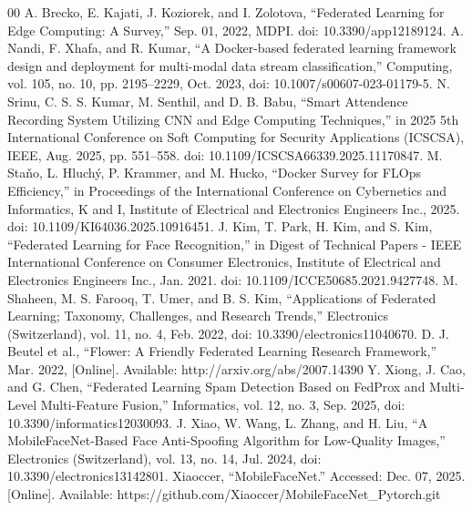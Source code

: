\documentclass[conference]{IEEEtran}
\begin{document}
\renewcommand{\refname}{Daftar Pustaka}
\begin{thebibliography}{00}
 A. Brecko, E. Kajati, J. Koziorek, and I. Zolotova, ``Federated Learning for Edge Computing: A Survey,'' Sep. 01, 2022, MDPI. doi: 10.3390/app12189124.
 A. Nandi, F. Xhafa, and R. Kumar, ``A Docker-based federated learning framework design and deployment for multi-modal data stream classification,'' Computing, vol. 105, no. 10, pp. 2195--2229, Oct. 2023, doi: 10.1007/s00607-023-01179-5.
 N. Srinu, C. S. S. Kumar, M. Senthil, and D. B. Babu, ``Smart Attendence Recording System Utilizing CNN and Edge Computing Techniques,'' in 2025 5th International Conference on Soft Computing for Security Applications (ICSCSA), IEEE, Aug. 2025, pp. 551--558. doi: 10.1109/ICSCSA66339.2025.11170847.
 M. Sta\v{n}o, L. Hluch\'{y}, P. Krammer, and M. Hucko, ``Docker Survey for FLOps Efficiency,'' in Proceedings of the International Conference on Cybernetics and Informatics, K and I, Institute of Electrical and Electronics Engineers Inc., 2025. doi: 10.1109/KI64036.2025.10916451.
 J. Kim, T. Park, H. Kim, and S. Kim, ``Federated Learning for Face Recognition,'' in Digest of Technical Papers - IEEE International Conference on Consumer Electronics, Institute of Electrical and Electronics Engineers Inc., Jan. 2021. doi: 10.1109/ICCE50685.2021.9427748.
 M. Shaheen, M. S. Farooq, T. Umer, and B. S. Kim, ``Applications of Federated Learning; Taxonomy, Challenges, and Research Trends,'' Electronics (Switzerland), vol. 11, no. 4, Feb. 2022, doi: 10.3390/electronics11040670.
 D. J. Beutel et al., ``Flower: A Friendly Federated Learning Research Framework,'' Mar. 2022, [Online]. Available: http://arxiv.org/abs/2007.14390
 Y. Xiong, J. Cao, and G. Chen, ``Federated Learning Spam Detection Based on FedProx and Multi-Level Multi-Feature Fusion,'' Informatics, vol. 12, no. 3, Sep. 2025, doi: 10.3390/informatics12030093.
 J. Xiao, W. Wang, L. Zhang, and H. Liu, ``A MobileFaceNet-Based Face Anti-Spoofing Algorithm for Low-Quality Images,'' Electronics (Switzerland), vol. 13, no. 14, Jul. 2024, doi: 10.3390/electronics13142801.
 Xiaoccer, ``MobileFaceNet.'' Accessed: Dec. 07, 2025. [Online]. Available: https://github.com/Xiaoccer/MobileFaceNet\_Pytorch.git
\end{thebibliography}
\end{document}

